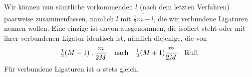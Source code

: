 Wir können nun sämtliche vorkommenden $l$ (nach dem letzten Verfahren) paarweise zusammenfassen, nämlich $l$ mit $\overline{\overline{\frac12m-l}}$, die wir verbundene Ligaturen nennen wollen. Eine einzige ist davon ausgenommen, die isoliert steht oder mit ihrer verbundenen Ligatur identisch ist, nämlich diejenige, die von
\[
\tfrac12(M-1)\mathbin{.}\frac{m}{2M}\quad\text{nach}\quad\tfrac12(M+1)\frac{m}{2M}\quad\text{läuft}
\]
Für verbundene Ligaturen ist $\alpha$ stets gleich.
